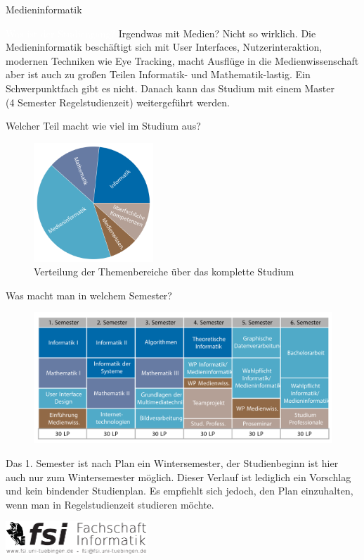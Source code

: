 	\begin{Huge}
			Medieninformatik
		\end{Huge}
		\begin{exampleblock}{\textcolor{white}{Was ist der Studiengang?}}
			Irgendwas mit Medien? Nicht so wirklich. Die Medieninformatik beschäftigt sich mit User Interfaces, Nutzerinteraktion, modernen Techniken wie Eye Tracking, macht Ausflüge in die Medienwissenschaft aber ist auch zu großen Teilen Informatik- und Mathematik-lastig. Ein Schwerpunktfach gibt es nicht. Danach kann das Studium mit einem Master \\ (4 Semester Regelstudienzeit) weitergeführt werden.
		\end{exampleblock}
	\begin{block}{Welcher Teil macht wie viel im Studium aus?}
		\begin{figure}[h!]
			\includegraphics[width=0.4\textwidth]{charts/medieninformatik-Piechart.pdf}
			\caption{Verteilung der Themenbereiche über das komplette Studium}
		\end{figure}
	\end{block}
	\begin{block}{Was macht man in welchem Semester?}
		\begin{figure}[h!]
			\includegraphics[width=\textwidth]{charts/medieninformatik-Studienplan_abWS18.pdf}
		\end{figure}
		Das 1. Semester ist nach Plan ein Wintersemester, der Studienbeginn ist hier auch nur zum Wintersemester möglich. 
		Dieser Verlauf ist lediglich ein Vorschlag und kein bindender Studienplan. Es empfiehlt sich jedoch, den Plan einzuhalten, wenn man in Regelstudienzeit studieren möchte.
	\end{block}
\vfill
\begin{flushright}
	\includegraphics[width=0.4\textwidth]{fsilogo.pdf}
\end{flushright}